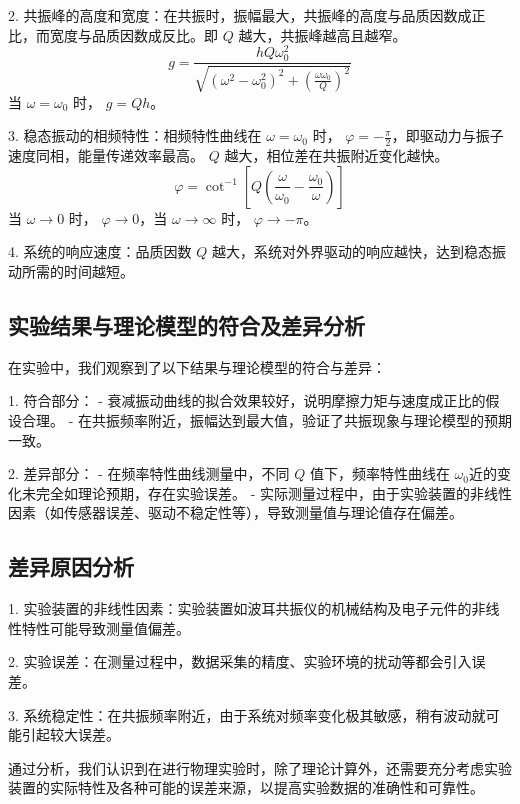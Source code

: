 \documentclass[UTF8]{ctexart}
\begin{document}
2. 共振峰的高度和宽度：在共振时，振幅最大，共振峰的高度与品质因数成正比，而宽度与品质因数成反比。即 \( Q \) 越大，共振峰越高且越窄。
   \[
   g = \frac{hQ \omega_0^2}{\sqrt{(\omega^2 - \omega_0^2)^2 + \left(\frac{\omega \omega_0}{Q}\right)^2}}
   \]
   当 \( \omega = \omega_0 \) 时， \( g = Qh \)。

3. 稳态振动的相频特性：相频特性曲线在 \( \omega = \omega_0 \) 时， \( \varphi = -\frac{\pi}{2} \)，即驱动力与振子速度同相，能量传递效率最高。 \( Q \) 越大，相位差在共振附近变化越快。
   \[
   \varphi = \cot^{-1} \left[Q \left( \frac{\omega}{\omega_0} - \frac{\omega_0}{\omega} \right)\right]
   \]
   当 \( \omega \rightarrow 0 \) 时， \( \varphi \rightarrow 0 \)，当 \( \omega \rightarrow \infty \) 时， \( \varphi \rightarrow -\pi \)。

4. 系统的响应速度：品质因数 \( Q \) 越大，系统对外界驱动的响应越快，达到稳态振动所需的时间越短。

\subsection{实验结果与理论模型的符合及差异分析}
在实验中，我们观察到了以下结果与理论模型的符合与差异：

1. 符合部分：
   - 衰减振动曲线的拟合效果较好，说明摩擦力矩与速度成正比的假设合理。
   - 在共振频率附近，振幅达到最大值，验证了共振现象与理论模型的预期一致。

2. 差异部分：
   - 在频率特性曲线测量中，不同 \( Q \) 值下，频率特性曲线在 \( \omega_0 \)近的变化未完全如理论预期，存在实验误差。
   - 实际测量过程中，由于实验装置的非线性因素（如传感器误差、驱动不稳定性等），导致测量值与理论值存在偏差。

\subsection{差异原因分析}
1. 实验装置的非线性因素：实验装置如波耳共振仪的机械结构及电子元件的非线性特性可能导致测量值偏差。

2. 实验误差：在测量过程中，数据采集的精度、实验环境的扰动等都会引入误差。

3. 系统稳定性：在共振频率附近，由于系统对频率变化极其敏感，稍有波动就可能引起较大误差。

通过分析，我们认识到在进行物理实验时，除了理论计算外，还需要充分考虑实验装置的实际特性及各种可能的误差来源，以提高实验数据的准确性和可靠性。



\end{document}
